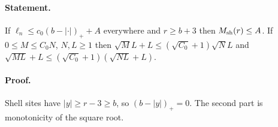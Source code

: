 \paragraph{Statement.} If $\ell_n\leq c_0(b-|\cdot|)_++A$ everywhere and $r\geq b+3$ then $M_{\rm sh}(r)\leq A$. If $0\leq M\leq C_0N$, $N,L\geq1$ then $\sqrt ML+L\leq(\sqrt{C_0}+1)\sqrt NL$ and $\sqrt{ML}+L\leq(\sqrt{C_0}+1)(\sqrt{NL}+L)$.
\paragraph{Proof.} Shell sites have $|y|\geq r-3\geq b$, so $(b-|y|)_+=0$. The second part is monotonicity of the square root.
